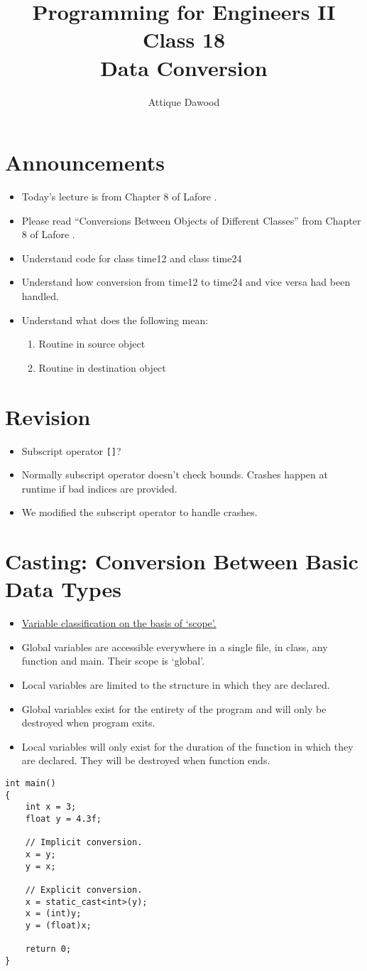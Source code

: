 \documentclass[12pt,a4paper]{article}
\title{\vspace{-2cm}Programming for Engineers II\\Class 18\\Data Conversion}
\author{Attique Dawood}
\begin{document}
\maketitle
\section{Announcements}
\begin{itemize}
\item Today's lecture is from Chapter 8 of Lafore \cite{Lafore}.
\item Please read ``Conversions Between Objects of Different Classes'' from Chapter 8 of Lafore \cite{Lafore}.
\item Understand code for class time12 and class time24
\item Understand how conversion from time12 to time24 and vice versa had been handled.
\item Understand what does the following mean:
\begin{enumerate}
\item Routine in source object
\item Routine in destination object
\end{enumerate}
\end{itemize}
\section{Revision}
\begin{itemize}
\item Subscript operator \verb|[]|?
\item Normally subscript operator doesn't check bounds. Crashes happen at runtime if bad indices are provided.
\item We modified the subscript operator to handle crashes.
\end{itemize}
\section{Casting: Conversion Between Basic Data Types}
\begin{itemize}
\item \underline{Variable classification on the basis of `scope'.}
\item Global variables are accessible everywhere in a single file, in class, any function and main. Their scope is `global'.
\item Local variables are limited to the structure in which they are declared.
\item Global variables exist for the entirety of the program and will only be destroyed when program exits.
\item Local variables will only exist for the duration of the function in which they are declared. They will be destroyed when function ends.
\end{itemize}
\begin{lstlisting}[caption={Variable Casting}]
int main()
{
	int x = 3;
	float y = 4.3f;

	// Implicit conversion.
	x = y;
	y = x;

	// Explicit conversion.
	x = static_cast<int>(y);
	x = (int)y;
	y = (float)x;
	
	return 0;
}
\end{lstlisting}
\end{document}
